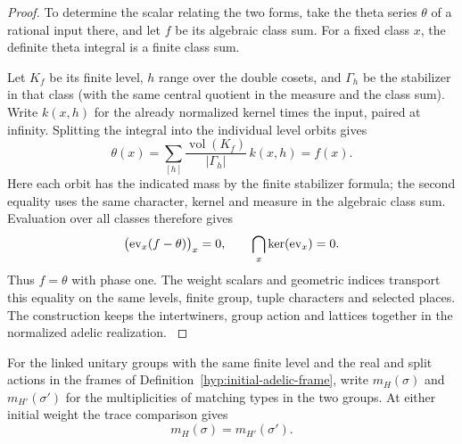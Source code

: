 \begin{proof}
To determine the scalar relating the two forms, take the
theta series \(\theta\) of a rational input there, and let \(f\)
be its algebraic class sum. For a fixed class \(x\), the definite theta integral is a finite class sum. 

Let \(K_f\) be its finite level, \(h\) range over the double cosets, and \(\Gamma_h\) be the stabilizer in that class (with the same central quotient in the measure and the class sum). Write \(k(x,h)\) for the already normalized kernel times the input, paired at infinity. Splitting the integral into the individual level orbits gives
\[
 \theta(x)=\sum_{[h]}\frac{\operatorname{vol}(K_f)}{|\Gamma_h|}\,k(x,h)=f(x).
\]
Here each orbit has the indicated mass by the finite stabilizer formula; the second equality uses the same character, kernel and measure in the algebraic class sum. Evaluation over all classes therefore gives
\[
  \bigl({\rm ev}_x(f-\theta)\bigr)_x=0,\qquad
  \bigcap_x\ker({\rm ev}_x)=0 .
\]
Thus \(f=\theta\) with phase one. The weight scalars and geometric
indices transport this equality on the same levels, finite
group, tuple characters and selected places. The construction
keeps the intertwiners, group action and lattices together
in the normalized adelic realization. \label{cor:automorphic-realization-4}
\end{proof}

\begin{proposition}\label{prop:linked-type-multiplicity}
For the linked unitary groups with the same finite level and
the real and split actions in the frames of
Definition~\ref{hyp:initial-adelic-frame}, write \(m_H(\sigma)\) and \(m_{H'}(\sigma')\) for the multiplicities of matching types in the two groups. At either initial weight the trace comparison gives
\[
 m_H(\sigma)=m_{H'}(\sigma').
\]
\end{proposition}

